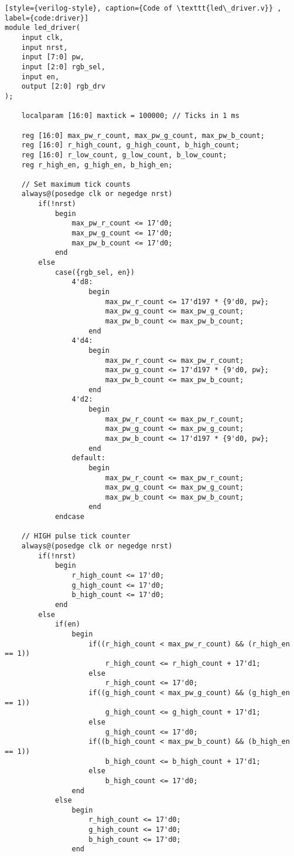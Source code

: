 \begin{lstlisting}[style={verilog-style}, caption={Code of \texttt{led\_driver.v}} , label={code:driver}]
module led_driver(
	input clk,
	input nrst,
	input [7:0] pw,
	input [2:0] rgb_sel,
	input en,
	output [2:0] rgb_drv
);

    localparam [16:0] maxtick = 100000; // Ticks in 1 ms
    
    reg [16:0] max_pw_r_count, max_pw_g_count, max_pw_b_count;
    reg [16:0] r_high_count, g_high_count, b_high_count;
    reg [16:0] r_low_count, g_low_count, b_low_count;
    reg r_high_en, g_high_en, b_high_en;

    // Set maximum tick counts    
    always@(posedge clk or negedge nrst)
        if(!nrst)
            begin
                max_pw_r_count <= 17'd0;
                max_pw_g_count <= 17'd0;
                max_pw_b_count <= 17'd0;
            end
        else
            case({rgb_sel, en})
                4'd8:
                    begin
                        max_pw_r_count <= 17'd197 * {9'd0, pw};
                        max_pw_g_count <= max_pw_g_count;
                        max_pw_b_count <= max_pw_b_count;
                    end
                4'd4:
                    begin
                        max_pw_r_count <= max_pw_r_count;
                        max_pw_g_count <= 17'd197 * {9'd0, pw};
                        max_pw_b_count <= max_pw_b_count;
                    end
                4'd2:
                    begin
                        max_pw_r_count <= max_pw_r_count;
                        max_pw_g_count <= max_pw_g_count;
                        max_pw_b_count <= 17'd197 * {9'd0, pw};
                    end
                default:
                    begin
                        max_pw_r_count <= max_pw_r_count;
                        max_pw_g_count <= max_pw_g_count;
                        max_pw_b_count <= max_pw_b_count;
                    end
            endcase
    
    // HIGH pulse tick counter
    always@(posedge clk or negedge nrst)
        if(!nrst)
            begin
                r_high_count <= 17'd0;
                g_high_count <= 17'd0;
                b_high_count <= 17'd0;
            end
        else
            if(en)
                begin
                    if((r_high_count < max_pw_r_count) && (r_high_en == 1))
                        r_high_count <= r_high_count + 17'd1;
                    else
                        r_high_count <= 17'd0;
                    if((g_high_count < max_pw_g_count) && (g_high_en == 1))
                        g_high_count <= g_high_count + 17'd1;
                    else
                        g_high_count <= 17'd0;
                    if((b_high_count < max_pw_b_count) && (b_high_en == 1))
                        b_high_count <= b_high_count + 17'd1;
                    else
                        b_high_count <= 17'd0;
                end
            else
                begin
                    r_high_count <= 17'd0;
                    g_high_count <= 17'd0;
                    b_high_count <= 17'd0;
                end


\end{lstlisting}
